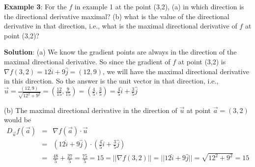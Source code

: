 \documentclass[conference,final,11pt,technote,onecolumn]{IEEEtran}\usepackage[]{graphicx}\usepackage[]{color}
\begin{document}
\textbf{Example 3}: For the $f$ in example 1 at the point (3,2), (a) in which direction is the directional derivative maximal? (b) what is the value of the directional derivative in that direction, i.e., what is the maximal directional derivative of $f$ at point (3,2)?

\textbf{Solution}: (a) We know the gradient points are always in the direction of the maximal directional derivative. So since the gradient of $f$ at point (3,2) is $\nabla f(3,2) = 12\hat{i} + 9\hat{j} = (12,9)$, we will have the maximal directional derivative in this direction. So the answer is the unit vector in that direction, i.e., $\vec u = \frac{(12,9)}{\sqrt{12^2+9^2}} = (\frac{12}{15},\frac{9}{15}) = (\frac{4}{5},\frac{3}{5}) = \frac{4}{5}\hat{i}+\frac{3}{5}\hat{j}$

(b) The maximal directional derivative in the direction of $\vec u$ at point $\vec a =(3,2)$ would be
\begin{eqnarray}
\nonumber D_{\vec u}f(\vec a) &=& \nabla f(\vec a)\cdot \vec u\\
\nonumber &=& (12\hat{i}+9\hat{j})\cdot (\frac{4}{5}\hat{i} + \frac{3}{5}\hat{j})\\
\nonumber &=& \frac{48}{5} + \frac{27}{5} = \frac{75}{5} = 15 = ||\nabla f(3,2)|| = ||12\hat{i}+9\hat{j}|| =  \sqrt{12^2+9^2} = 15
\end{eqnarray}
\end{document}

